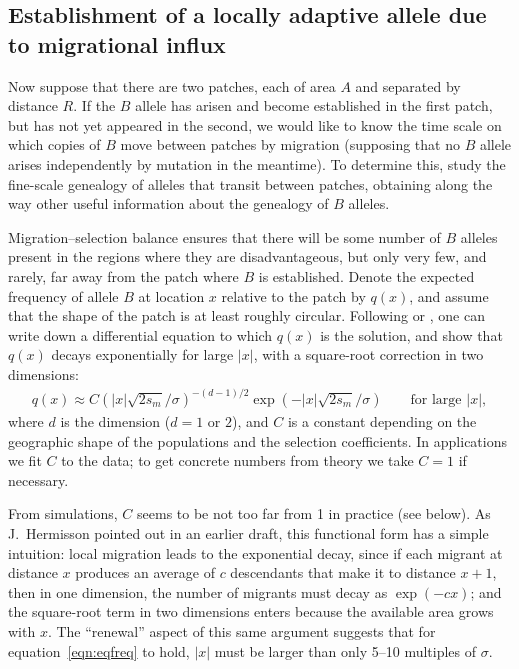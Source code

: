 \documentclass{article}
\newcommand{\citet}[1]{\cite{#1}}
\begin{document}
\subsection[Establishment by Migration]{Establishment of a locally adaptive allele due to migrational influx}
\label{ss:patchymigration}

Now suppose that there are two patches, each of area $A$ and separated by distance $R$. 
If the $B$ allele has arisen and become established in the first patch, but has not yet appeared in the second,
we would like to know the time scale on which copies of $B$ move between patches by migration
(supposing that no $B$ allele arises independently by mutation in the meantime).
To determine this, 
study the fine-scale genealogy of alleles that transit between patches,
obtaining along the way other useful information about the genealogy of $B$ alleles.

Migration--selection balance ensures that 
there will be some number of $B$ alleles present in the regions where they are disadvantageous,
but only very few, and rarely, far away from the patch where $B$ is established.
Denote the expected frequency of allele $B$ at location $x$ relative to the patch by $q(x)$,
and assume that the shape of the patch is at least roughly circular.
Following \citet{haldane1948theory} or \citet{slatkin1973geneflow}, one can write down a differential equation to which $q(x)$ is the solution,
and show that $q(x)$ decays exponentially for large $|x|$,
with a square-root correction in two dimensions:
\begin{align} \label{eqn:eqfreq}
  q(x) \approx C \left( |x| \sqrt{2 s_m}/\sigma \right)^{-(d-1)/2} \exp( - |x| \sqrt{2 s_m} / \sigma) \qquad \text{for large $|x|$},
\end{align}
where $d$ is the dimension ($d=1$ or $2$), 
and $C$ is a constant depending on the geographic shape of the populations and the selection coefficients.
In applications we fit $C$ to the data;
to get concrete numbers from theory we take $C=1$ if necessary.

From simulations, $C$ seems to be not too far from 1 in practice (see below).
As J.\ Hermisson pointed out in an earlier draft,
this functional form has a simple intuition:
local migration leads to the exponential decay,
since if each migrant at distance $x$ 
produces an average of $c$ descendants that make it to distance $x+1$, 
then in one dimension, the number of migrants must decay as $\exp(-cx)$;
and the square-root term in two dimensions 
enters because the available area grows with $x$.  
The ``renewal'' aspect of this same argument suggests that for equation~\eqref{eqn:eqfreq} to hold,
$|x|$ must be larger than only 5--10 multiples of $\sigma$.
\end{document}
